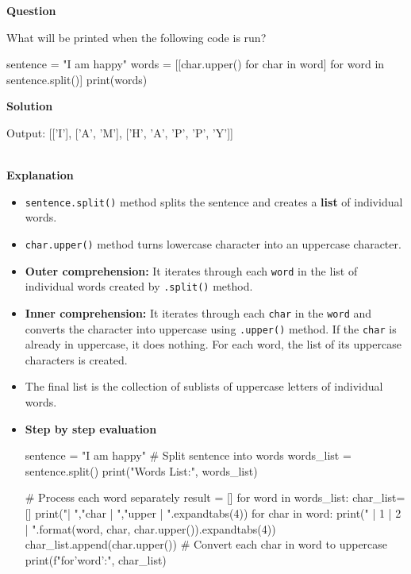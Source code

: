 \documentclass[10pt]{extarticle}
\begin{document}
\textbf{Question}

What will be printed when the following code is run?

    \begin{python}
    sentence = "I am happy"
    words = [[char.upper() for char in word] for word in sentence.split()]
    print(words)

    \end{python}

\noindent\textbf{Solution}

\begin{python}
Output: [['I'], ['A', 'M'], ['H', 'A', 'P', 'P', 'Y']]
\end{python}  \\

\noindent\textbf{Explanation}

\begin{itemize}
    \item \colorbox{gray!20}{\texttt{sentence.split()}} method splits the sentence and creates a \textbf{list} of individual words.
    \item \colorbox{gray!20}{\texttt{char.upper()}} method turns lowercase character into an uppercase character.
    \item \textbf{Outer comprehension:} It iterates through each \texttt{word} in the list of individual words created by \colorbox{gray!20}{\texttt{.split()}} method.
    \item \textbf{Inner comprehension:} It iterates through each \texttt{char} in the \texttt{word} and converts the character into uppercase using \colorbox{gray!20}{\texttt{.upper()}} method. If the \texttt{char} is already in uppercase, it does nothing. For each word, the list of its uppercase characters is created.
    \item The final list is the collection of sublists of uppercase letters of individual words.
    \item \textbf{Step by step evaluation}
    \begin{tcolorbox}[colback=gray!20, colframe=gray!50, sharp corners=southwest]
    \begin{pycode}
sentence = "I am happy"
# Split sentence into words
words_list = sentence.split()
print("Words List:\n", words_list)  

# Process each word separately
result = []
for word in words_list:
  char_list=[]
  print("\nword | ","char | ","upper  | ".expandtabs(4))
  for char in word:
    print(" |   {1}  |   {2}   |  ".format(word, char, char.upper()).expandtabs(4))
    char_list.append(char.upper())  # Convert each char in word to uppercase
  print(f"\nSublist for'{word}':", char_list)  
    \end{pycode}
    \end{tcolorbox} 
\end{itemize}
\end{document}

